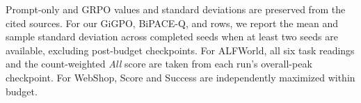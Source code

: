 \begin{table}[t]
\begin{tabular}{@{}llccccccccc@{}}
\bottomrule
\end{tabular}
\begin{flushleft}
\footnotesize Prompt-only and GRPO values and standard deviations are preserved from the cited sources. For our GiGPO, BiPACE-Q, and \method rows, we report the mean and sample standard deviation across completed seeds when at least two seeds are available, excluding post-budget checkpoints. For ALFWorld, all six task readings and the count-weighted \emph{All} score are taken from each run's overall-peak checkpoint. For WebShop, Score and Success are independently maximized within budget.
\end{flushleft}
\end{table}

